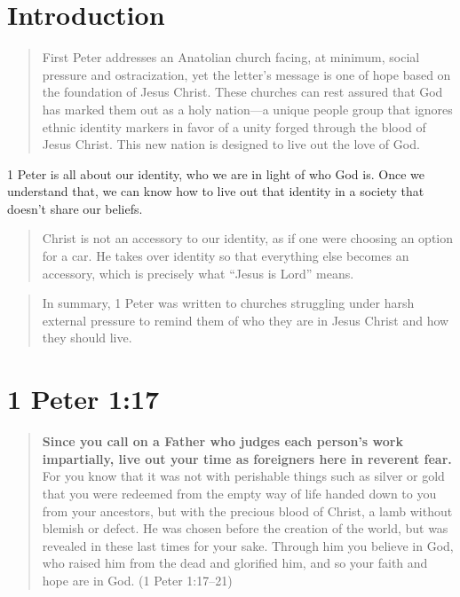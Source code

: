 \newcommand{\Date}{November 19, 2018}
\newcommand{\Title}{Bible Notes: 1 Peter 1}



\section{Introduction}

\begin{quote}
    First Peter addresses an Anatolian church facing, at minimum, social
    pressure and ostracization, yet the letter's message is one of hope based on
    the foundation of Jesus Christ. These churches can rest assured that God has
    marked them out as a holy nation---a unique people group that ignores ethnic
    identity markers in favor of a unity forged through the blood of Jesus
    Christ. This new nation is designed to live out the love of God.
    \autocite{himes:2017}
\end{quote}

1 Peter is all about our identity, who we are in light of who God is. Once we
understand that, we can know how to live out that identity in a society that
doesn't share our beliefs.

\begin{quote}
    Christ is not an accessory to our identity, as if one were choosing an
    option for a car. He takes over identity so that everything else becomes an
    accessory, which is precisely what \enquote{Jesus is Lord} means.
    \autocite[8]{snodgrass:2011}
\end{quote}

\begin{quote}
    In summary, 1 Peter was written to churches struggling under harsh external
    pressure to remind them of who they are in Jesus Christ and how they should
    live.
    \autocite{himes:2017}
\end{quote}

\section{1 Peter 1:17}

\begin{quote}
    \textbf{Since you call on a Father who judges each person's work
    impartially, live out your time as foreigners here in reverent fear.} For
    you know that it was not with perishable things such as silver or gold that
    you were redeemed from the empty way of life handed down to you from your
    ancestors, but with the precious blood of Christ, a lamb without blemish or
    defect. He was chosen before the creation of the world, but was revealed in
    these last times for your sake. Through him you believe in God, who raised
    him from the dead and glorified him, and so your faith and hope are in God.
    (1 Peter 1:17--21)
\end{quote}


